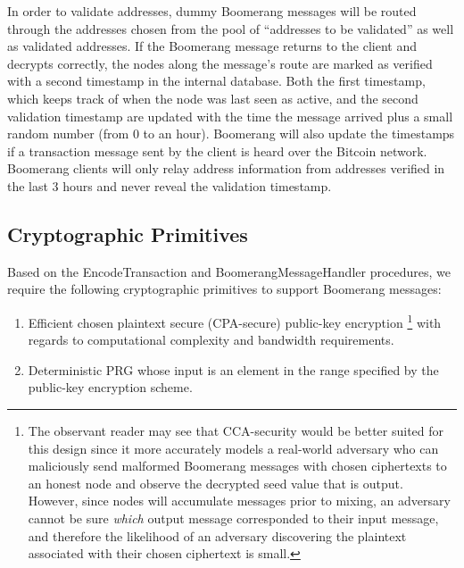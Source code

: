 In order to validate addresses, dummy Boomerang messages will be routed through the addresses chosen from the pool of “addresses to be validated” as well as validated addresses. If the Boomerang message returns to the client and decrypts correctly, the nodes along the message's route are marked as verified with a second timestamp in the internal database. Both the first timestamp, which keeps track of when the node was last seen as active, and the second validation timestamp are updated with the time the message arrived plus a small random number (from 0 to an hour). Boomerang will also update the timestamps if a transaction message sent by the client is heard over the Bitcoin network. Boomerang clients will only relay address information from addresses verified in the last 3 hours and never reveal the validation timestamp.

\subsection{Cryptographic Primitives} \label{sec:crypto}

Based on the {\sf EncodeTransaction} and {\sf BoomerangMessageHandler} procedures, we require the following cryptographic primitives to support Boomerang messages:
\begin{enumerate}
	\item Efficient chosen plaintext secure (CPA-secure) public-key encryption \footnote{The observant reader may see that CCA-security would be better suited for this design since it more accurately models a real-world adversary who can maliciously send malformed Boomerang messages with chosen ciphertexts to an honest node and observe the decrypted seed value that is output. However, since nodes will accumulate messages prior to mixing, an adversary cannot be sure \emph{which} output message corresponded to their input message, and therefore the likelihood of an adversary discovering the plaintext associated with their chosen ciphertext is small.} with regards to computational complexity and bandwidth requirements. 
	\item Deterministic PRG whose input is an element in the range specified by the public-key encryption scheme.
\end{enumerate}

